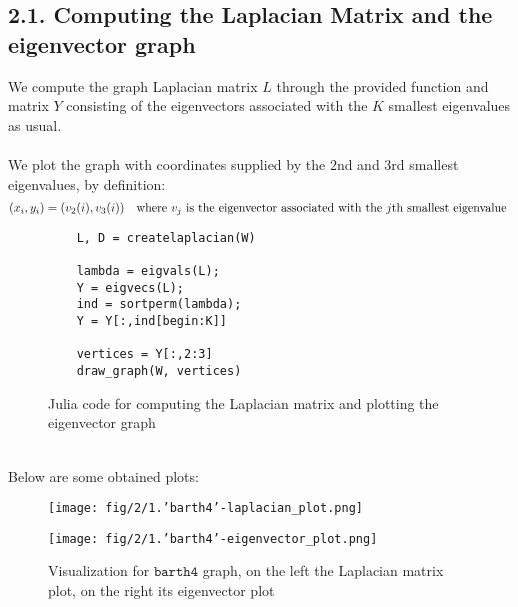 \documentclass[unicode,11pt,a4paper,oneside,numbers=endperiod,openany]{scrartcl}
\begin{document}
\subsection*{2.1. Computing the Laplacian Matrix and the eigenvector graph}
We compute the graph Laplacian matrix $L$ through the provided function and matrix $Y$ consisting of the eigenvectors associated with the $K$ smallest eigenvalues as usual.\\\\
We plot the graph with coordinates supplied by the $2$nd and $3$rd smallest eigenvalues, by definition:
$$ \centering
    (x_i,y_i) = (v_2(i), v_3(i))\quad \text{where $v_j$ is the eigenvector associated with the $j$th smallest eigenvalue }
$$
\begin{figure}[h!]
\begin{verbatim}
    L, D = createlaplacian(W)

    lambda = eigvals(L);
    Y = eigvecs(L);
    ind = sortperm(lambda);
    Y = Y[:,ind[begin:K]]
    
    vertices = Y[:,2:3]
    draw_graph(W, vertices)
\end{verbatim}
\caption{Julia code for computing the Laplacian matrix and plotting the eigenvector graph}
\end{figure}\\
Below are some obtained plots:
\begin{figure}[h!]
    \begin{minipage}{0.5\linewidth}
        \centering
        \texttt{[image: fig/2/1.'barth4'-laplacian\_plot.png]}
    \end{minipage}
    \begin{minipage}{0.5\linewidth}
        \centering
        \texttt{[image: fig/2/1.'barth4'-eigenvector\_plot.png]}
    \end{minipage}
        \caption{Visualization for $\texttt {barth4}$ graph, on the left the Laplacian matrix plot, on the right its eigenvector plot}
\end{figure}\\

\clearpage
\end{document}
